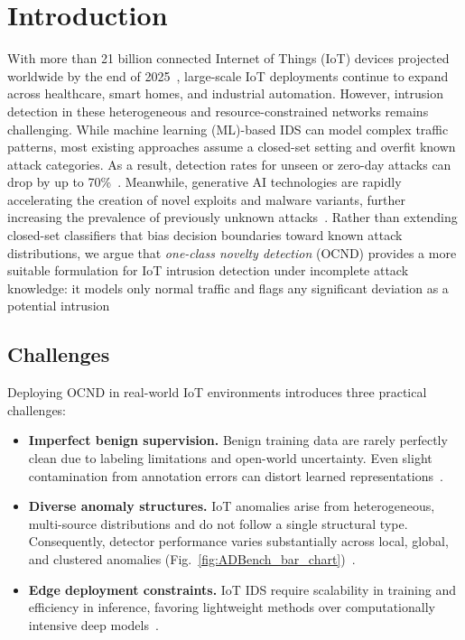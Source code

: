 \documentclass[final,twocolumn,10pt]{elsarticle}
\begin{document}
\section{Introduction} 
With more than 21 billion connected Internet of Things (IoT) devices projected worldwide by the end of 2025~\cite{iotanalytics2025devices}, large-scale IoT deployments continue to expand across healthcare, smart homes, and industrial automation. However, intrusion detection in these heterogeneous and resource-constrained networks remains challenging. While machine learning (ML)-based IDS can model complex traffic patterns, most existing approaches assume a closed-set setting and overfit known attack categories. As a result, detection rates for unseen or zero-day attacks can drop by up to 70\%~\cite{Sarhan2023ZeroShot}. Meanwhile, generative AI technologies are rapidly accelerating the creation of novel exploits and malware variants, further increasing the prevalence of previously unknown attacks~\cite{Ferrag2025GenAICybersec,Xu2025LLMAutonomousAttack}. Rather than extending closed-set classifiers that bias decision boundaries toward known attack distributions, we argue that \emph{one-class novelty detection} (OCND) provides a more suitable formulation for IoT intrusion detection under incomplete attack knowledge: it models only normal traffic and flags any significant deviation as a potential intrusion

\subsection{Challenges}
Deploying OCND in real-world IoT environments introduces three practical challenges: 
\begin{itemize} 
\item \textbf{Imperfect benign supervision.} Benign training data are rarely perfectly clean due to labeling limitations and open-world uncertainty. Even slight contamination from annotation errors can distort learned representations~\cite{Prabowo2026UncleanTrainingNIDS}.

\item \textbf{Diverse anomaly structures.} IoT anomalies arise from heterogeneous, multi-source distributions and do not follow a single structural type. Consequently, detector performance varies substantially across local, global, and clustered anomalies (Fig.~\ref{fig:ADBench_bar_chart})~\cite{han2022adbench,KANG2019772}.
\item \textbf{Edge deployment constraints.} IoT IDS require scalability in training and efficiency in inference, favoring lightweight methods over computationally intensive deep models~\cite{Rahman2025IoTIDSSurvey,beggel2019robust,jodelka2021adaptive}.
\end{itemize} 
\end{document}
